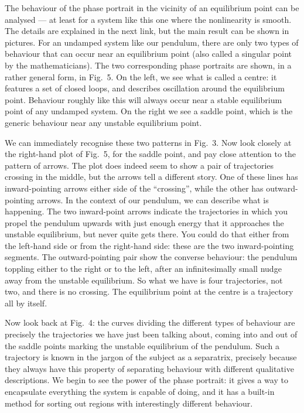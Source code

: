   The behaviour of the phase portrait in the vicinity of an equilibrium point 
  can be analysed — at least for a system like this one where the nonlinearity 
  is smooth. The details are explained in the next link, but the main result 
  can be shown in pictures. For an undamped system like our pendulum, there are 
  only two types of behaviour that can occur near an equilibrium point (also 
  called a singular point by the mathematicians). The two corresponding phase 
  portraits are shown, in a rather general form, in Fig.\ 5. On the left, we 
  see what is called a centre: it features a set of closed loops, and describes 
  oscillation around the equilibrium point. Behaviour roughly like this will 
  always occur near a stable equilibrium point of any undamped system. On the 
  right we see a saddle point, which is the generic behaviour near any unstable 
  equilibrium point. 

  We can immediately recognise these two patterns in Fig.\ 3. Now look closely 
  at the right-hand plot of Fig.\ 5, for the saddle point, and pay close 
  attention to the pattern of arrows. The plot does indeed seem to show a pair 
  of trajectories crossing in the middle, but the arrows tell a different 
  story. One of these lines has inward-pointing arrows either side of the 
  “crossing”, while the other has outward-pointing arrows. In the context of 
  our pendulum, we can describe what is happening. The two inward-point arrows 
  indicate the trajectories in which you propel the pendulum upwards with just 
  enough energy that it approaches the unstable equilibrium, but never quite 
  gets there. You could do that either from the left-hand side or from the 
  right-hand side: these are the two inward-pointing segments. The 
  outward-pointing pair show the converse behaviour: the pendulum toppling 
  either to the right or to the left, after an infinitesimally small nudge away 
  from the unstable equilibrium. So what we have is four trajectories, not two, 
  and there is no crossing. The equilibrium point at the centre is a trajectory 
  all by itself. 

  Now look back at Fig.\ 4: the curves dividing the different types of 
  behaviour are precisely the trajectories we have just been talking about, 
  coming into and out of the saddle points marking the unstable equilibrium of 
  the pendulum. Such a trajectory is known in the jargon of the subject as a 
  separatrix, precisely because they always have this property of separating 
  behaviour with different qualitative descriptions. We begin to see the power 
  of the phase portrait: it gives a way to encapsulate everything the system is 
  capable of doing, and it has a built-in method for sorting out regions with 
  interestingly different behaviour. 

